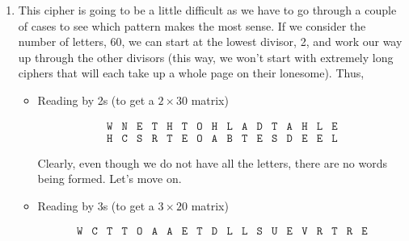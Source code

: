 {\begin{enumerate}
              Putting it all together, we get, ``\href{https://www.archives.gov/founding-docs/declaration-transcript}{When in the course of human eve...}'' (Declaration of Independence)
        \item This cipher is going to be a little difficult as we have to go through a couple of cases to see which pattern makes the most sense. If we consider the number of letters, 60, we can start at the lowest divisor, 2, and work our way up through the other divisors (this way, we won't start with extremely long ciphers that will each take up a whole page on their lonesome). Thus,
              \begin{itemize}
                  \item Reading by 2s (to get a \(2\times 30\) matrix)
                        \begin{center}
                            \vspace*{-1cm}
                            \[
                                \begin{array}{cccccccccccccccc}
                                    \texttt{W} & \texttt{N} & \texttt{E} & \texttt{T} & \texttt{H} & \texttt{T} & \texttt{O} & \texttt{H} & \texttt{L} & \texttt{A} & \texttt{D} & \texttt{T} & \texttt{A} & \texttt{H} & \texttt{L} & \texttt{E} \\
                                    \texttt{H} & \texttt{C} & \texttt{S} & \texttt{R} & \texttt{T} & \texttt{E} & \texttt{O} & \texttt{A} & \texttt{B} & \texttt{T} & \texttt{E} & \texttt{S} & \texttt{D} & \texttt{E} & \texttt{E} & \texttt{L}
                                \end{array}
                            \]
                            \vspace*{-1cm}
                        \end{center}
                        Clearly, even though we do not have all the letters, there are no words being formed. Let's move on.
                  \item Reading by 3s (to get a \(3\times 20\) matrix)
                        \begin{center}
                            \vspace*{-1cm}
                            \[
                                \begin{array}{cccccccccccccccccccc}
                                    \texttt{W} & \texttt{C} & \texttt{T} & \texttt{T} & \texttt{O} & \texttt{A} & \texttt{A} & \texttt{E} & \texttt{T} & \texttt{D} & \texttt{L} & \texttt{L} & \texttt{S} & \texttt{U} & \texttt{E} & \texttt{V} & \texttt{R} & \texttt{T} & \texttt{R} & \texttt{E} \\


\end{array}\]
\end{center}
\end{itemize}
\end{enumerate}}
